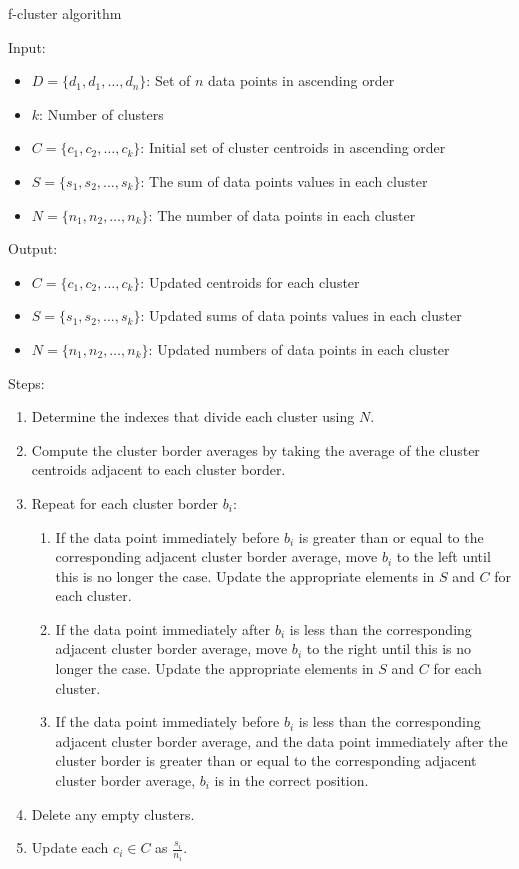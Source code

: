 \documentclass[conference,compsoc]{IEEEtran}
\begin{document}
\begin{algorithm}\label{alg-3}
    \caption{f-cluster algorithm}
    Input:
        \begin{itemize}
            \item $D = \{d_1, d_1, \dots, d_n\}$: Set of $n$ data points in ascending order
            \item $k$: Number of clusters
            \item $C = \{c_1, c_2, \dots, c_k\}$: Initial set of cluster centroids in ascending order
            \item $S = \{s_1, s_2, \dots, s_k\}$: The sum of data points values in each cluster
            \item $N = \{n_1, n_2, \dots, n_k\}$: The number of data points in each cluster
        \end{itemize}
    Output:
        \begin{itemize}
            \item $C = \{c_1, c_2, \dots, c_k\}$: Updated centroids for each cluster
            \item $S = \{s_1, s_2, \dots, s_k\}$: Updated sums of data points values in each cluster
            \item $N = \{n_1, n_2, \dots, n_k\}$: Updated numbers of data points in each cluster
        \end{itemize}
    Steps:
        \begin{enumerate}
            \item Determine the indexes that divide each cluster using $N$.
            \item Compute the cluster border averages by taking the average of the cluster centroids adjacent to each cluster border.
            \item Repeat for each cluster border $b_i$:
            \begin{enumerate}
                \item If the data point immediately before $b_i$ is greater than or equal to the corresponding adjacent cluster border average, move $b_i$ to the left until this is no longer the case. Update the appropriate elements in $S$ and $C$ for each cluster.
                \item If the data point immediately after $b_i$ is less than the corresponding adjacent cluster border average, move $b_i$ to the right until this is no longer the case. Update the appropriate elements in $S$ and $C$ for each cluster.
                \item If the data point immediately before $b_i$ is less than the corresponding adjacent cluster border average, and the data point immediately after the cluster border is greater than or equal to the corresponding adjacent cluster border average, $b_i$ is in the correct position.
            \end{enumerate}
            \item Delete any empty clusters.
            \item Update each $c_i \in C$ as $\frac{s_i}{n_i}$.
        \end{enumerate}
\end{algorithm}
\end{document}
